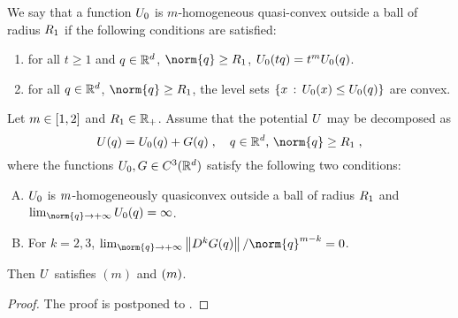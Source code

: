 We say that a function $U_0$ is $m$-homogeneous quasi-convex
outside a ball of radius $R_1$ if the following conditions are satisfied:
\begin{enumerate}[(QC-1)]
\item for all $t \geq 1$ and $q \in \mathbb{R}^d$, $\norm{\q}\geq \Rexp$, $U_0(t q)= t^m U_0(q)$.
\item for all $q \in \mathbb{R}^d$, $\norm{\q} \geq \Rexp$, the level sets $\{ x\, :\, U_0(x) \leq U_0(q)\}$ are convex.
\end{enumerate}
\begin{proposition}
\label{le:convex}
Let $m \in \left[1,2\right]$  and $R_1 \in \mathbb{R}_+$.  Assume that the potential $U$ may be decomposed as
$$
\F(\q)=\F_0(\q)+G(\q) \eqsp, \quad \text{$\q\in \rset^d$, $\norm{\q} \geq \Rexp$} \eqsp,
$$
where the functions $U_0,G \in C^3(\mathbb{R}^d)$ satisfy the following two conditions:
  \begin{enumerate}[(A)]
  \item $U_0$ is $m$-homogeneously quasiconvex outside a ball of radius $R_1$ and $\lim_{\norm{\q} \to \plusinfty} \F_0(\q)=\infty$.
\label{le:convex:a}
\item
\label{le:convex:b}
For $k=2,3$, $\lim_{\norm{\q} \to \plusinfty}\normop{D^k G(\q)}/  \norm{\q}^{\m-k}= 0$.
  \end{enumerate}
Then $U$ satisfies  $(m)$ and  $(m)$.
\end{proposition}
\begin{proof}
The proof is postponed to .
\end{proof}

